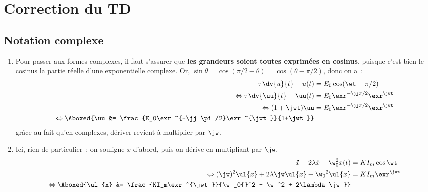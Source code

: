 \documentclass[a4paper, 12pt, final, garamond]{book}
\begin{document}
\setcounter{chapter}{5}

\chapter{Correction du TD}

\section{Notation complexe}

\begin{enumerate}
    \item Pour passer aux formes complexes, il faut s'assurer que \textbf{les
        grandeurs soient toutes exprimées en cosinus}, puisque c'est bien le
        cosinus la partie réelle d'une exponentielle complexe. Or, $\sin\theta =
        \cos(\pi/2-\theta) = \cos(\theta-\pi/2)$, donc on a~:
        \begin{align*}
            \tau \dv{u}{t} + u(t) &= E_0\cos(\wt - \pi/2)\\
            \Leftrightarrow
            \tau \dv{\uu}{t} + \uu(t) &= E_0\exr^{-\jj\pi/2}\exr^{\jwt}\\
            \Leftrightarrow
            (1+\jwt)\uu &= E_0\exr^{-\jj\pi/2}\exr^{\jwt}\\
            \Leftrightarrow
            \Aboxed{\uu &= \frac{E_0\exr^{-\jj\pi/2}\exr^{\jwt}}{1+\jwt}}
        \end{align*}
        grâce au fait qu'en complexes, dériver revient à multiplier par $\jw$.
    \item Ici, rien de particulier~: on souligne $x$ d'abord, puis on dérive en
        multipliant par $\jw$.
        \begin{align*}
            \ddot{x} +  2\lambda \dot x + \w_0^2 x(t) &= KI_m\cos\wt\\
            \Leftrightarrow
            (\jw)^2\ul{x} + 2\lambda\jw \ul{x} + \w_0{}^2 \ul{x} &=
                KI_m\exr^{\jwt}\\
            \Leftrightarrow
            \Aboxed{\ul{x} &= \frac{KI_m\exr^{\jwt}}{\w_0{}^2 - \w^2 +
                2\lambda\jw}}
        \end{align*}
\end{enumerate}
\end{document}
